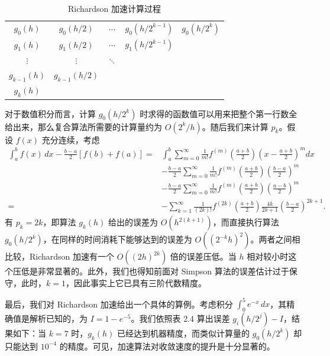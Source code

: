 \begin{table}[htbp]
\centering
\caption{Richardson 加速计算过程}
\label{tab:richardson}
\begin{tabular}{ccccc}
\toprule
$g_0(h)$ & $g_0(h/2)$ & $\cdots$ & $g_0(h/2^{k-1})$ & $g_0(h/2^k)$\\
$g_1(h)$ & $g_1(h/2)$ & $\cdots$ & $g_1(h/2^{k-1})$ & \\
$\vdots$ & $\vdots$ & $\ddots$ & & \\
$g_{k-1}(h)$ & $g_{k-1}(h/2)$ & & & \\
$g_k(h)$ & & & & \\
\bottomrule
\end{tabular}
\end{table}

对于数值积分而言，计算 $g_0(h/2^k)$ 时求得的函数值可以用来把整个第一行数全给出来，那么复合算法所需要的计算量约为 $O(2^k/h)$。随后我们来计算 $p_k$。假设 $f(x)$ 充分连续，考虑
\begin{equation}
\begin{aligned}
\int_a^b f(x)\,dx-\frac{b-a}{2}[f(b)+f(a)]
={}&\int_a^b\sum_{m=0}^{\infty}\frac1{m!}f^{(m)}\left(\frac{a+b}{2}\right)\left(x-\frac{a+b}{2}\right)^m dx\\
&-\frac{b-a}{2}\sum_{m=0}^{\infty}\frac1{m!}f^{(m)}\left(\frac{a+b}{2}\right)\left(\frac{b-a}{2}\right)^m\\
&-\frac{b-a}{2}\sum_{m=0}^{\infty}\frac1{m!}f^{(m)}\left(\frac{a+b}{2}\right)\left(\frac{a-b}{2}\right)^m\\
={}&-\sum_{k=1}^{\infty}\frac1{(2k)!}f^{(2k)}\left(\frac{a+b}{2}\right)\frac{4k}{2k+1}\left(\frac{b-a}{2}\right)^{2k+1}.
\end{aligned}
\tag{2.2.15}
\end{equation}
有 $p_k=2k$，即算法 $g_k(h)$ 给出的误差为 $O(h^{2(k+1)})$，而直接执行算法 $g_0(h/2^k)$，在同样的时间消耗下能够达到的误差为 $O((2^{-k}h)^2)$。两者之间相比较，Richardson 加速有一个 $O((2h)^{2k})$ 倍的误差压低。当 $h$ 相对较小时这个压低是非常显著的。此外，我们也得知前面对 Simpson 算法的误差估计过于保守，此时，$k=1$，因此事实上它已具有三阶代数精度。

最后，我们对 Richardson 加速给出一个具体的算例。考虑积分 $\int_0^5 e^{-x}\,dx$，其精确值是解析已知的，为 $I=1-e^{-5}$。我们依照表 2.4 算出误差 $g_i(h/2^j)-I$，结果如下：当 $k=7$ 时，$g_k(h)$ 已经达到机器精度，而类似计算量的 $g_0(h/2^k)$ 却只能达到 $10^{-4}$ 的精度。可见，加速算法对收敛速度的提升是十分显著的。


